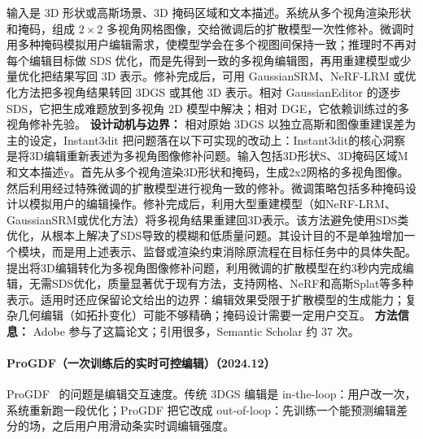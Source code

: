 输入是 3D 形状或高斯场景、3D 掩码区域和文本描述。系统从多个视角渲染形状和掩码，组成 $2\times2$ 多视角网格图像，交给微调后的扩散模型一次性修补。微调时用多种掩码模拟用户编辑需求，使模型学会在多个视图间保持一致；推理时不再对每个编辑目标做 SDS 优化，而是先得到一致的多视角编辑图，再用重建模型或少量优化把结果写回 3D 表示。修补完成后，可用 GaussianSRM、NeRF-LRM 或优化方法把多视角结果转回 3DGS 或其他 3D 表示。相对 GaussianEditor 的逐步 SDS，它把生成难题放到多视角 2D 模型中解决；相对 DGE，它依赖训练过的多视角修补先验。
\textbf{设计动机与边界：} 相对原始 3DGS 以独立高斯和图像重建误差为主的设定，Instant3dit 把问题落在以下可实现的改动上：Instant3dit的核心洞察是将3D编辑重新表述为多视角图像修补问题。输入包括3D形状S、3D掩码区域M和文本描述y。首先从多个视角渲染3D形状和掩码，生成2x2网格的多视角图像。然后利用经过特殊微调的扩散模型进行视角一致的修补。微调策略包括多种掩码设计以模拟用户的编辑操作。修补完成后，利用大型重建模型（如NeRF-LRM、GaussianSRM或优化方法）将多视角结果重建回3D表示。该方法避免使用SDS类优化，从根本上解决了SDS导致的模糊和低质量问题。其设计目的不是单独增加一个模块，而是用上述表示、监督或渲染约束消除原流程在目标任务中的具体失配。提出将3D编辑转化为多视角图像修补问题，利用微调的扩散模型在约3秒内完成编辑，无需SDS优化，质量显著优于现有方法，支持网格、NeRF和高斯Splat等多种表示。适用时还应保留论文给出的边界：编辑效果受限于扩散模型的生成能力；复杂几何编辑（如拓扑变化）可能不够精确；掩码设计需要一定用户交互。
\textbf{方法信息：} Adobe 参与了这篇论文；引用很多，Semantic Scholar 约 37 次。



\paragraph{ProGDF（一次训练后的实时可控编辑）（2024.12）}
ProGDF~\cite{2412_08152} 的问题是编辑交互速度。传统 3DGS 编辑是 in-the-loop：用户改一次，系统重新跑一段优化；ProGDF 把它改成 out-of-loop：先训练一个能预测编辑差分的场，之后用户用滑动条实时调编辑强度。

